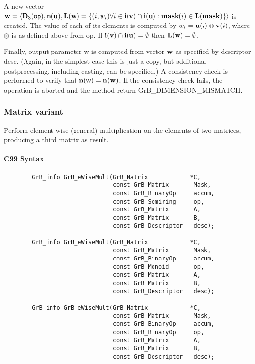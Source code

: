 A new vector ${\bf w} = \langle \bold{D}_3({\sf op}),
\bold{n}({\bf u}), \bold{L}({\bf w}) = \{(i,w_i)  \forall i \in
{\bf i}({\bf v}) \cap {\bf i}({\bf u}) : {\bf mask}(i)
\in \bold{L}({\bf mask}) \} \rangle$ is created.  The value of each of its
elements is computed by $w_i = {\bf u}(i) \otimes {\bf v}(i)$,
where $\otimes$ is as defined above from {\sf op}.
If ${\bf i}({\bf v}) \cap {\bf i}({\bf u}) = \emptyset$
then $\bold{L}({\bf w}) = \emptyset$.

Finally, output parameter {\sf w} is computed from vector ${\bf w}$
as specified by descriptor {\sf desc}. (Again, in the simplest case this
is just a copy, but additional postprocessing, including casting, can be specified.)  A consistency check is
performed to verify that $\bold{n}({\sf w}) = \bold{n}({\bf w})$. If
the consistency check fails, the operation is aborted and the method
return {\sf GrB\_DIMENSION\_MISMATCH}.


\subsubsection{Matrix variant}

Perform element-wise (general) multiplication on the elements of two matrices,
producing a third matrix as result.

\paragraph{C99 Syntax}

\begin{verbatim}
        GrB_info GrB_eWiseMult(GrB_Matrix            *C,
                               const GrB_Matrix       Mask,
                               const GrB_BinaryOp     accum,
                               const GrB_Semiring     op, 
                               const GrB_Matrix       A,
                               const GrB_Matrix       B,
                               const GrB_Descriptor   desc);
                            
        GrB_info GrB_eWiseMult(GrB_Matrix            *C,
                               const GrB_Matrix       Mask,
                               const GrB_BinaryOp     accum,
                               const GrB_Monoid       op, 
                               const GrB_Matrix       A,
                               const GrB_Matrix       B,
                               const GrB_Descriptor   desc);
                            
        GrB_info GrB_eWiseMult(GrB_Matrix            *C,
                               const GrB_Matrix       Mask,
                               const GrB_BinaryOp     accum,
                               const GrB_BinaryOp     op, 
                               const GrB_Matrix       A,
                               const GrB_Matrix       B,
                               const GrB_Descriptor   desc);
\end{verbatim}

